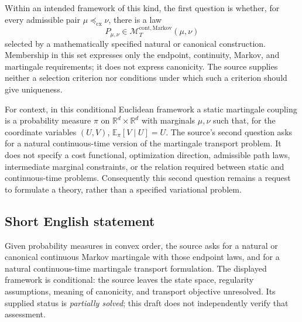 \documentclass[11pt]{article}
\newcommand{\R}{\mathbb{R}}
\newcommand{\E}{\mathbb{E}}
\begin{document}
Within an intended framework of this kind, the first question is whether, for every admissible pair \(\mu\preceq_{\mathrm{cx}}\nu\), there is a law
\[
P_{\mu,\nu}\in\mathcal M^{\mathrm{cont,Markov}}_T(\mu,\nu)
\]
selected by a mathematically specified natural or canonical construction. Membership in this set expresses only the endpoint, continuity, Markov, and martingale requirements; it does not express canonicity. The source supplies neither a selection criterion nor conditions under which such a criterion should give uniqueness.

For context, in this conditional Euclidean framework a static martingale coupling is a probability measure \(\pi\) on \(\R^d\times\R^d\) with marginals \(\mu,\nu\) such that, for the coordinate variables \((U,V)\), \(\E_\pi[V\mid U]=U\). The source's second question asks for a natural continuous-time version of the martingale transport problem. It does not specify a cost functional, optimization direction, admissible path laws, intermediate marginal constraints, or the relation required between static and continuous-time problems. Consequently this second question remains a request to formulate a theory, rather than a specified variational problem.
\subsection{Short English statement}
Given probability measures in convex order, the source asks for a natural or canonical continuous Markov martingale with those endpoint laws, and for a natural continuous-time martingale transport formulation. The displayed framework is conditional: the source leaves the state space, regularity assumptions, meaning of canonicity, and transport objective unresolved. Its supplied status is \emph{partially solved}; this draft does not independently verify that assessment.
\end{document}

